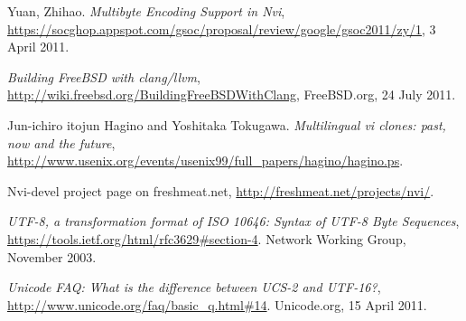 \documentclass[11pt,twoside,a4paper]{article}
\begin{document}
\begin{thebibliography}{9}
 Yuan, Zhihao. \emph{Multibyte Encoding Support in Nvi},
\url{https://socghop.appspot.com/gsoc/proposal/review/google/gsoc2011/zy/1},
3 April 2011.

 \emph{Building FreeBSD with clang/llvm},
\url{http://wiki.freebsd.org/BuildingFreeBSDWithClang}, FreeBSD.org, 24 July 2011.

 Jun-ichiro itojun Hagino and Yoshitaka Tokugawa.
\emph{Multilingual vi clones: past, now and the future},
\url{http://www.usenix.org/events/usenix99/full_papers/hagino/hagino.ps}.

 Nvi-devel project page on freshmeat.net,
\url{http://freshmeat.net/projects/nvi/}.

 \emph{UTF-8, a transformation format of ISO 10646: Syntax of
	UTF-8 Byte Sequences},
\url{https://tools.ietf.org/html/rfc3629#section-4}. Network Working Group, November 2003.

 \emph{Unicode FAQ: What is the difference between UCS-2 and
	UTF-16?}, \url{http://www.unicode.org/faq/basic_q.html#14}. Unicode.org,
15 April 2011.

\end{thebibliography}
\end{document}
